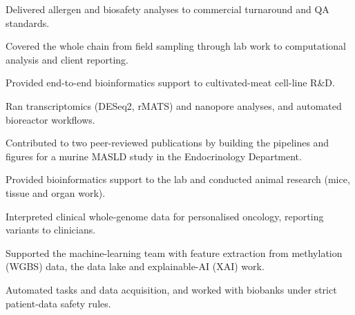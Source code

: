 \documentclass[]{deedy-resume-openfont}
\begin{document}
\begin{minipage}[t]{0.66\textwidth}
\begin{tightemize}
\item Delivered allergen and biosafety analyses to commercial turnaround and QA standards.
\item Covered the whole chain from field sampling through lab work to computational analysis and client reporting.
\end{tightemize}
\sectionsep

\descript{| \RoleBeneMeat}
\location{\WhenBeneMeat}
\begin{tightemize}
\item Provided end-to-end bioinformatics support to cultivated-meat cell-line R\&D.
\item Ran transcriptomics (DESeq2, rMATS) and nanopore analyses, and automated bioreactor workflows.
\end{tightemize}
\sectionsep

\descript{| \RoleLumc}
\location{\WhenLumc}
\begin{tightemize}
\item Contributed to two peer-reviewed publications by building the pipelines and figures for a murine MASLD study in the Endocrinology Department.
\item Provided bioinformatics support to the lab and conducted animal research (mice, tissue and organ work).
\end{tightemize}
\sectionsep

\begin{tightemize}
\item Interpreted clinical whole-genome data for personalised oncology, reporting variants to clinicians.
\item Supported the machine-learning team with feature extraction from methylation (WGBS) data, the data lake and explainable-AI (XAI) work.
\item Automated tasks and data acquisition, and worked with biobanks under strict patient-data safety rules.
\end{tightemize}

\end{minipage}

\newpage
\end{document}
